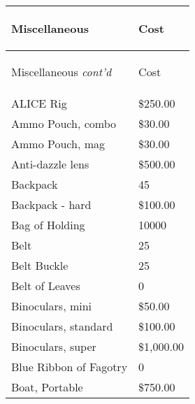 \documentclass[twoside]{book}
\begin{document}
\begin{longtable}{p{1.25in}l} 
  Miscellaneous
  &
  \begin{turn}{70}{Cost}\end{turn}
          
  \\
  \hline
  \hline
  \endfirsthead
  Miscellaneous \textit{cont'd}
        
  &
  \begin{turn}{70}{Cost}\end{turn}
          
  \\
  \endhead
      
  \raggedright
           ALICE Rig 
  &
   \$250.00 
  \tabularnewline
  \hline
      
  \raggedright
           Ammo Pouch, combo 
  &
   \$30.00 
  \tabularnewline
  \hline
      
  \raggedright
           Ammo Pouch, mag 
  &
   \$30.00 
  \tabularnewline
  \hline
      
  \raggedright
           Anti-dazzle lens 
  &
   \$500.00 
  \tabularnewline
  \hline
      
  \raggedright
           Backpack 
  &
   45 
  \tabularnewline
  \hline
      
  \raggedright
           Backpack - hard 
  &
   \$100.00 
  \tabularnewline
  \hline
      
  \raggedright
           Bag of Holding 
  &
   10000 
  \tabularnewline
  \hline
      
  \raggedright
           Belt 
  &
   25 
  \tabularnewline
  \hline
      
  \raggedright
           Belt Buckle 
  &
   25 
  \tabularnewline
  \hline
      
  \raggedright
           Belt of Leaves 
  &
   0 
  \tabularnewline
  \hline
      
  \raggedright
           Binoculars, mini 
  &
   \$50.00 
  \tabularnewline
  \hline
      
  \raggedright
           Binoculars, standard 
  &
   \$100.00 
  \tabularnewline
  \hline
      
  \raggedright
           Binoculars, super 
  &
   \$1,000.00 
  \tabularnewline
  \hline
      
  \raggedright
           Blue Ribbon of Fagotry 
  &
   0 
  \tabularnewline
  \hline
      
  \raggedright
           Boat, Portable 
  &
   \$750.00 
  \tabularnewline
  \hline
      

\end{longtable}
\end{document}
